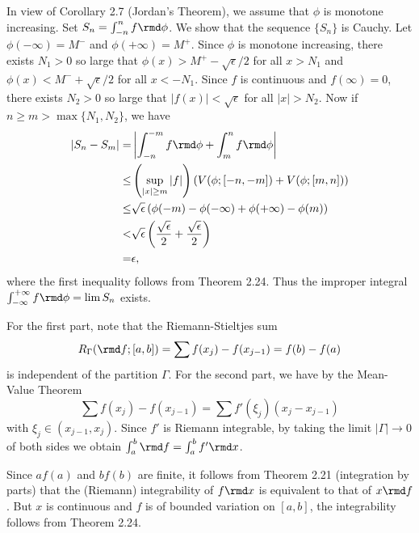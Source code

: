 \begin{exercise}{2.17}
  In view of Corollary 2.7 (Jordan's Theorem),
  we assume that $\phi$ is monotone increasing.
  Set $S_n = \int_{-n}^n f \rmd \phi$.
  We show that the sequence $\{S_n\}$ is Cauchy.
  Let $\phi(-\infty) = M^-$ and $\phi(+\infty) = M^+$.
  Since $\phi$ is monotone increasing,
  there exists $N_1 > 0$ so large that
  $\phi(x) > M^+ - \sqrt{\epsilon} / 2$ for all $x > N_1$
  and $\phi(x) < M^- + \sqrt{\epsilon} / 2$ for all $x < -N_1$.
  Since $f$ is continuous and $f(\infty) = 0$,
  there exists $N_2 > 0$ so large that
  $|f(x)| < \sqrt{\epsilon}$ for all $|x| > N_2$.
  Now if $n \ge m > \max\{N_1, N_2\}$, we have
  \[
    \begin{aligned}
      \left| S_n - S_m \right| =
      & \left| \int_{-n}^{-m} f \rmd \phi + \int_m^n f \rmd \phi \right| \\
      \le & \left( \sup_{|x| \ge m} |f| \right)
      \left( V(\phi;[-n,-m]) + V(\phi;[m,n]) \right) \\
      \le & \sqrt{\epsilon}
      \left( \phi(-m) - \phi(-\infty) + \phi(+\infty) - \phi(m) \right) \\
      < & \sqrt{\epsilon}
      \left( \frac{\sqrt{\epsilon}}{2} + \frac{\sqrt{\epsilon}}{2} \right) \\
      = &\epsilon,
    \end{aligned}
  \]
  where the first inequality follows from Theorem 2.24.
  Thus the improper integral $\int_{-\infty}^{+\infty} f \rmd \phi = \lim S_n$ exists.
\end{exercise}

\begin{exercise}{2.31}
  For the first part,
  note that the Riemann-Stieltjes sum
  \[
    R_\Gamma(\rmd f; [a,b]) = \sum f(x_j) - f(x_{j-1}) = f(b) - f(a)
  \]
  is independent of the partition $\Gamma$.
  For the second part, we have by the Mean-Value Theorem
  \[
    \sum f(x_j) - f(x_{j-1}) = \sum f'(\xi_j) \left( x_j - x_{j-1} \right)
  \]
  with $\xi_j \in (x_{j-1}, x_j)$.
  Since $f'$ is Riemann integrable,
  by taking the limit $|\Gamma| \rightarrow 0$ of both sides we obtain
  $\int_a^b \rmd f = \int_a^b f' \rmd x$.
\end{exercise}

\begin{exercise}{2.32}
  Since $af(a)$ and $bf(b)$ are finite,
  it follows from Theorem 2.21 (integration by parts) that
  the (Riemann) integrability of $f \rmd x$
  is equivalent to that of $x \rmd f$.
  But $x$ is continuous and $f$ is of bounded variation on $[a,b]$,
  the integrability follows from Theorem 2.24.
\end{exercise}
